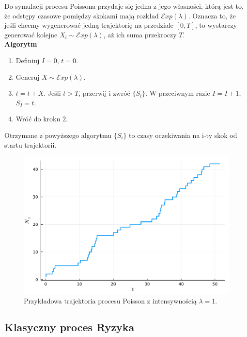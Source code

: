 \documentclass[12pt]{mwart}
\begin{document}
	\noindent Do symulacji procesu Poissona przydaje się jedna z jego własności, którą jest to, że odstępy czasowe pomiędzy skokami mają rozkład $\mathcal{E}xp(\lambda)$.
	Oznacza to, że jeśli chcemy wygenerować jedną trajektorię na przedziale $[0, T]$, to wystarczy generować kolejne $X_i \sim \mathcal{E}xp(\lambda)$, aż ich suma przekroczy $T$.\\
	
	\noindent \textbf{Algorytm}
	\begin{enumerate}[leftmargin=10mm]
		\item Definiuj $I = 0$, $t=0$.
		\item Generuj $X \sim \mathcal{E}xp(\lambda)$.
		\item $t = t + X$. Jeśli $t > T$, przerwij i zwróć $\{S_i\}$. W przeciwnym razie $I = I + 1$, $S_I = t$.
		\item Wróć do kroku 2.
	\end{enumerate}
	Otrzymane z powyższego algorytmu $\{S_i\}$ to czasy oczekiwania na i-ty skok od startu trajektorii.
	
	\begin{figure}[H]
		\centering
		\includegraphics[width=\columnwidth]{fig/poisson.pdf}
		\caption{Przykładowa trajektoria procesu Poisson z intensywnością $\lambda = 1$.}
	\end{figure}
	
	
	
	\subsection{Klasyczny proces Ryzyka}
	
\end{document}
